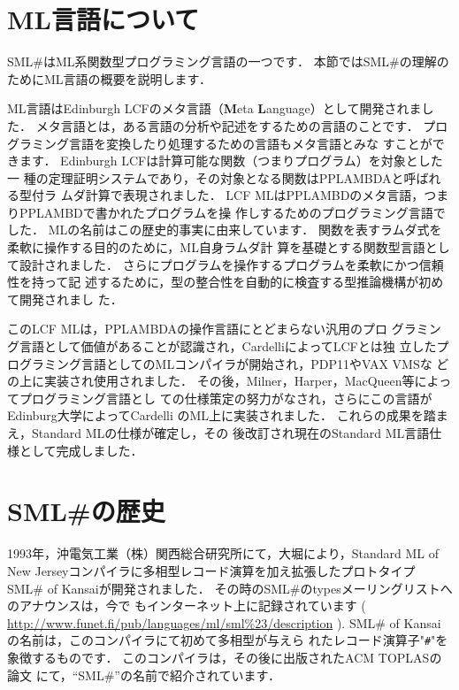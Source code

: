 \documentclass{jbook}
\newcommand{\smlsharp}{SML\#}
\newcommand{\code}[1]{\mbox{{\tt #1}}}
\begin{document}
\section{ML言語について}
\label{sec:mllanguage}

	\smlsharp{}はML系関数型プログラミング言語の一つです．
	本節では\smlsharp{}の理解のためにML言語の概要を説明します．

	ML言語はEdinburgh LCF\cite{gord79}のメタ言語（{\bf M}eta {\bf
L}anguage）として開発されました．
	メタ言語とは，ある言語の分析や記述をするための言語のことです．
	プログラミング言語を変換したり処理するための言語もメタ言語とみな
すことができます．
	Edinburgh LCFは計算可能な関数（つまりプログラム）を対象とした一
種の定理証明システムであり，その対象となる関数はPPLAMBDAと呼ばれる型付ラ
ムダ計算で表現されました．
	LCF MLはPPLAMBDのメタ言語，つまりPPLAMBDで書かれたプログラムを操
作しするためのプログラミング言語でした．
	MLの名前はこの歴史的事実に由来しています．
	関数を表すラムダ式を柔軟に操作する目的のために，ML自身ラムダ計
算を基礎とする関数型言語として設計されました．
	さらにプログラムを操作するプログラムを柔軟にかつ信頼性を持って記
述するために，型の整合性を自動的に検査する型推論機構が初めて開発されまし
た．

	このLCF MLは，PPLAMBDAの操作言語にとどまらない汎用のプロ
グラミング言語として価値があることが認識され，CardelliによってLCFとは独
立したプログラミング言語としてのMLコンパイラが開始され，PDP11やVAX VMSな
どの上に実装され使用されました．
	その後，Milner，Harper，MacQueen等によってプログラミング言語とし
ての仕様策定の努力がなされ，さらにこの言語がEdinburg大学によってCardelli
のML上に実装されました．
	これらの成果を踏まえ，Standard MLの仕様\cite{sml}が確定し，その
後改訂され現在のStandard ML言語仕様\cite{sml97}として完成しました．

\section{\smlsharp{}の歴史}
\label{sec:smlsharpHistory}

	1993年，沖電気工業（株）関西総合研究所にて，大堀により，Standard
ML of New Jerseyコンパイラに多相型レコード演算を加え拡張したプロトタイプ
SML\# of Kansaiが開発されました．
	その時の\smlsharp{}のtypesメーリングリストへのアナウンスは，今で
もインターネット上に記録されています
(
\url{http://www.funet.fi/pub/languages/ml/sml%23/description}
).
	SML\# of Kansaiの名前は，このコンパイラにて初めて多相型が与えら
れたレコード演算子"\code{\#}"を象徴するものです．
	このコンパイラは，その後に出版されたACM TOPLASの論文
\cite{ohor95toplas}にて，``\smlsharp{}''の名前で紹介されています．
\end{document}
